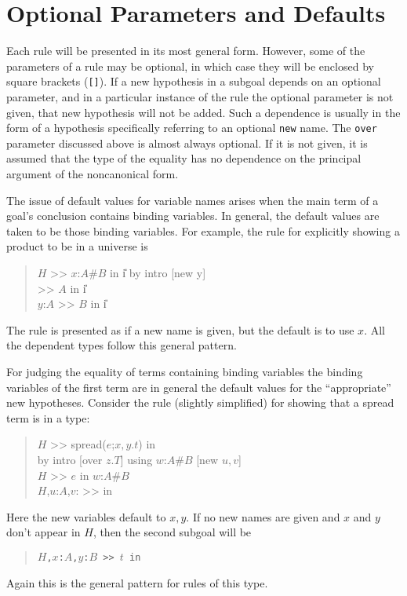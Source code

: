 \section{Optional Parameters and Defaults}
Each rule will be presented in its most general form.
However, some of the parameters of a rule may be optional,
in which case they will be enclosed by square brackets ({\tt []}).
If a new hypothesis in a subgoal depends on an optional parameter,
and in a particular instance of the rule the optional parameter is not
given, that new hypothesis will not be added.
Such a  dependence is usually in the form of a hypothesis specifically
referring to an optional {\tt new} name.
The {\tt over} parameter discussed above is almost always optional.
If it is not given, it is assumed that the type of the equality has no
dependence on the principal argument of the noncanonical form.

The issue of default values for variable names arises when the main term 
of a goal's conclusion contains binding variables.
In general, the default values are taken to be those binding variables.
For example, the rule for explicitly showing a product to be in a universe
is
\begin{quote}
\goal $H$ >> $x$:$A$\#$B$ in \U{i} by intro [new y] \\
\subgoal >> $A$ in \U{i} \\
\subgoal $y$:$A$ >> $B$ in \U{i}
\end{quote}
The rule is presented as if a new name is given, but the default is to 
use $x$.  All the dependent types follow this general pattern.

For judging the equality of terms containing binding variables the binding
variables of the first term are in general the default values for the
``appropriate'' new hypotheses.  Consider the rule (slightly
simplified)
for showing that a
spread term is in a type:
\begin{quote}
\goal $H$ >> spread($e$;$x,y.t$) in  \\
\continuegoal by intro [over $z.T$] using $w$:$A$\#$B$ [new $u,v$] \\
\subgoal $H$ >> $e$ in $w$:$A$\#$B$ \\
\subgoal $H$,$u$:$A$,$v$: >>
             in 
\end{quote}
Here the new variables default to $x,y$.  If no new names are given and
$x$ and $y$ don't appear in $H$, then the second subgoal will be
\begin{quote}
\tt\subgoal $H$,$x$:$A$,$y$:$B$ >> $t$ in 
\end{quote}
Again this is the general pattern for rules of this type.


